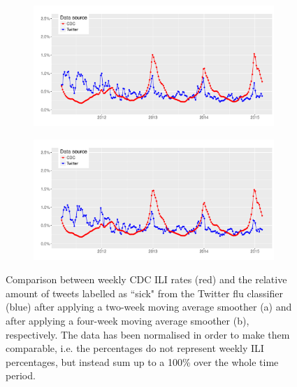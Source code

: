 \documentclass[11pt, a4paper,twoside]{report}\usepackage[]{graphicx}\usepackage[]{color}
\begin{document}
\begin{figure}[H]
\centering
  \begin{subfigure}[t]{1\textwidth}
  \includegraphics[width=1\linewidth]{27_cdc_twitter_comp_nat_ma2.pdf}
  \caption{}
  \label{fig:cdc_tw_comp_nat_ma2}
  \end{subfigure}
  
  \begin{subfigure}[t]{1\textwidth}
  \includegraphics[width=1\linewidth]{28_cdc_twitter_comp_nat_ma4.pdf}
  \caption{}
  \label{fig:cdc_tw_comp_nat_ma4}
  \end{subfigure}
  \caption{Comparison between weekly CDC ILI rates (red) and the relative amount of tweets labelled as ``sick" from the Twitter flu classifier (blue) after applying a two-week moving average smoother (a) and after applying a four-week moving average smoother (b), respectively. The data has been normalised in order to make them comparable, i.e. the percentages do not represent weekly ILI percentages, but instead sum up to a 100\% over the whole time period.}
  \label{fig:cdc_tw_comp_nat_tot}
\end{figure}
\end{document}
